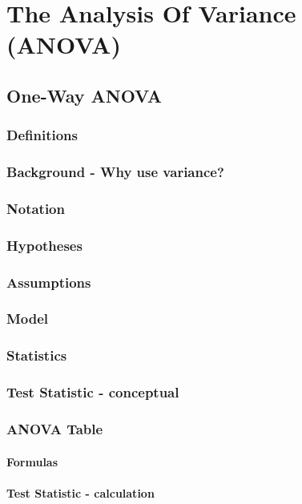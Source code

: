 \chapter{The Analysis Of Variance (ANOVA)}  %

\section{One-Way ANOVA}  %
    \subsection{Definitions}  %
    \subsection{Background - Why use variance?}  %
    \subsection{Notation}  %
    \subsection{Hypotheses}  %
    \subsection{Assumptions}  %
    \subsection{Model}  %
    \subsection{Statistics}  %
    \subsection{Test Statistic - conceptual}  %
    \subsection{ANOVA Table}  %
        \subsubsection{Formulas}  %
        \subsubsection{Test Statistic - calculation}  %
